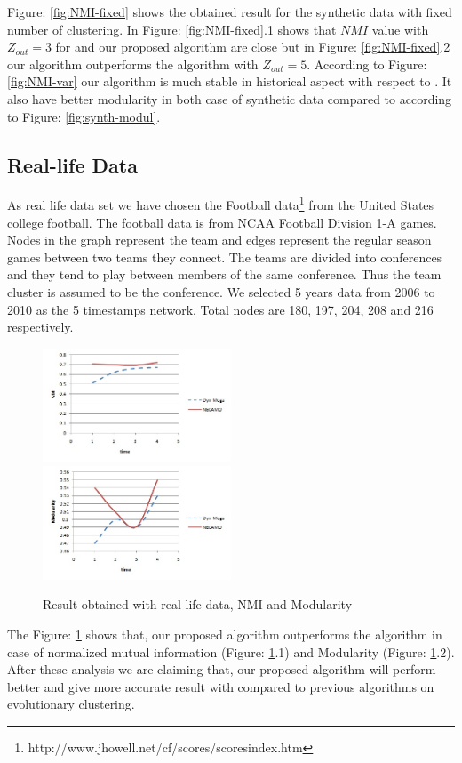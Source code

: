 \documentclass[12pt]{arsubmit}
\begin{document}
Figure: \ref{fig:NMI-fixed} shows the obtained result for the synthetic data with fixed number of clustering. In Figure: \ref{fig:NMI-fixed}.1 shows that $NMI$ value with $Z_{out} = 3$ for \cite{dynmoga} and our proposed algorithm are close but in Figure: \ref{fig:NMI-fixed}.2 our algorithm outperforms the \cite{dynmoga} algorithm with $Z_{out} = 5$.
According to Figure: \ref{fig:NMI-var} our algorithm is much stable in historical aspect with respect to \cite{dynmoga}. It also have better modularity in both case of synthetic data compared to \cite{dynmoga} according to Figure: \ref{fig:synth-modul}.

\subsection {Real-life Data}
As real life data set we have chosen the Football data\footnote[1]{http://www.jhowell.net/cf/scores/scoresindex.htm} from the United States college football. The football data is from NCAA Football Division 1-A games. Nodes in the graph represent the team and edges represent the regular season games between two teams they connect. The teams are divided into conferences and they tend to play between members of the same conference. Thus the team cluster is assumed to be the conference. We selected 5 years data from 2006 to 2010 as the 5 timestamps network. Total nodes are 180, 197, 204, 208 and 216 respectively. 
\begin{figure}
\centering
{\label {fig:NMI-real}\includegraphics[width=0.5\textwidth]{real-data-NMI}}
{\label{fig:module-real}\includegraphics[width=0.5\textwidth]{real-modul}}
\caption{Result obtained with real-life data, NMI and Modularity}
\label {fig:real-data}
\end{figure}
The Figure: \ref{fig:real-data} shows that, our proposed algorithm outperforms the \cite{dynmoga} algorithm in case of normalized mutual information (Figure: \ref{fig:real-data}.1) and Modularity (Figure: \ref{fig:real-data}.2).\\
After these analysis we are claiming that, our proposed algorithm will perform better and give more accurate result  with compared to previous algorithms on evolutionary clustering.
\end{document}
